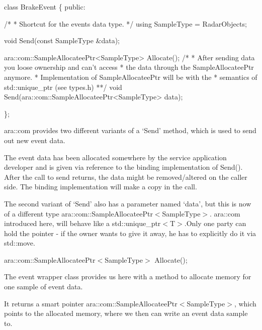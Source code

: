 \begin{DoxyCode}
\textcolor{keyword}{class }BrakeEvent \{
\textcolor{keyword}{public}:

\textcolor{comment}{/*}
\textcolor{comment}{* Shortcut for the events data type.}
\textcolor{comment}{*/}
\textcolor{keyword}{using} SampleType = RadarObjects;

\textcolor{keywordtype}{void} Send(\textcolor{keyword}{const} SampleType &data);

ara::com::SampleAllocateePtr<SampleType> Allocate();
 \textcolor{comment}{/*}
\textcolor{comment}{ * After sending data you loose ownership and can’t access}
\textcolor{comment}{ * the data through the SampleAllocateePtr anymore.}
\textcolor{comment}{ * Implementation of SampleAllocateePtr will be with the}
\textcolor{comment}{ * semantics of std::unique\_ptr (see types.h)}
\textcolor{comment}{ **/}
 \textcolor{keywordtype}{void} Send(ara::com::SampleAllocateePtr<SampleType> data);

 \};
\end{DoxyCode}

\begin{DoxyItemize}
\item ara\+::com provides two different variants of a ‘\+Send’ method, which is used to send out new event data.
\end{DoxyItemize}
\begin{DoxyEnumerate}
\item The event data has been allocated somewhere by the service application developer and is given via reference to the binding implementation of Send(). After the call to send returns, the data might be removed/altered on the caller side. The binding implementation will make a copy in the call.
\item The second variant of ‘\+Send’ also has a parameter named ‘data’, but this is now of a different type ara\+::com\+::\+Sample\+Allocatee\+Ptr$<$\+Sample\+Type$>$. ara\+::com introduced here, will behave like a std\+::unique\+\_\+ptr$<$\+T$>$.\+Only one party can hold the pointer -\/ if the owner wants to give it away, he has to explicitly do it via std\+::move.
\item ara\+::com\+::\+Sample\+Allocatee\+Ptr$<$\+Sample\+Type$>$ Allocate();
\begin{DoxyItemize}
\item The event wrapper class provides us here with a method to allocate memory for one sample of event data.
\item It returns a smart pointer ara\+::com\+::\+Sample\+Allocatee\+Ptr$<$\+Sample\+Type$>$, which points to the allocated memory, where we then can write an event data sample to.
\end{DoxyItemize}
\end{DoxyEnumerate}


